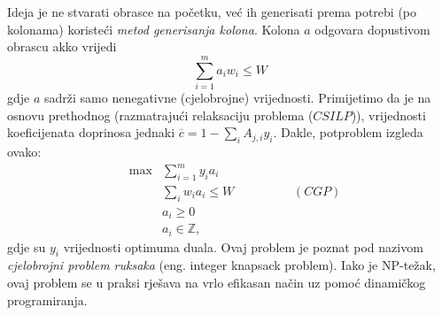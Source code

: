 \documentclass[a4paper, utf8, 11pt, colorlinks]{article}
\begin{document}
 Ideja je ne stvarati obrasce na početku, već ih generisati prema potrebi (po kolonama) koristeći \emph{metod generisanja kolona}. Kolona $a$ odgovara dopustivom obrascu akko vrijedi 
 $$ \sum_{i=1}^m a_i w_i \leq W $$
 gdje $a$ sadrži samo nenegativne (cjelobrojne) vrijednosti. 
Primijetimo da je na osnovu prethodnog (razmatrajući relaksaciju problema ($CSILP$)), vrijednosti koeficijenata doprinosa 
jednaki $\overline{c} = 1 - \sum_{i} A_{j,i} y_i$.  
 Dakle, potproblem izgleda ovako:
$$ \begin{array}{lll}
     &\max& \sum_{i=1}^m y_i a_i \\
     &  &\sum_{i} w_i a_i \leq W \hspace{2cm} (CGP)\\
     & &a_i \geq 0 \\
     & &a_i \in \mathbb{Z},
 \end{array}$$
  gdje su $y_i$ vrijednosti optimuma duala. 
 Ovaj problem je poznat pod nazivom \emph{cjelobrojni problem ruksaka} (eng. integer knapsack problem). Iako je NP-težak, ovaj problem se u praksi rješava na vrlo efikasan način uz pomoć dinamičkog programiranja. 
 
\end{document}
